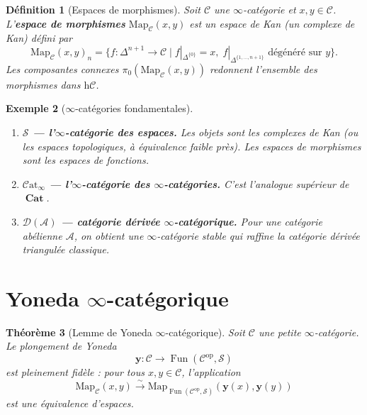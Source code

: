 \documentclass[a4paper,12pt]{book}
\DeclareMathOperator{\Fun}{Fun}
\DeclareMathOperator{\Cat}{\mathbf{Cat}}
\newcommand{\op}{\mathrm{op}}
\newtheorem{theoreme}{Théorème}[chapter]
\newtheorem{definition}[theoreme]{Définition}
\newtheorem{exemple}[theoreme]{Exemple}
\begin{document}
\begin{definition}[Espaces de morphismes]\label{def:mapping-space}
Soit $\mathcal{C}$ une $\infty$-catégorie et $x, y \in \mathcal{C}$.
L'\textbf{espace de morphismes} $\mathrm{Map}_\mathcal{C}(x, y)$
est un espace de Kan (un complexe de Kan) défini par
\[
  \mathrm{Map}_\mathcal{C}(x, y)_n
  = \{f \colon \Delta^{n+1} \to \mathcal{C} \mid
      f|_{\Delta^{\{0\}}} = x,\;
      f|_{\Delta^{\{1,\ldots,n+1\}}} \text{ dégénéré sur } y\}.
\]
Les composantes connexes $\pi_0(\mathrm{Map}_\mathcal{C}(x,y))$
redonnent l'ensemble des morphismes dans $\mathrm{h}\mathcal{C}$.
\end{definition}

\begin{exemple}[$\infty$-catégories fondamentales]\label{ex:infty-cats}
\begin{enumerate}[label=(\roman*)]
\item \textbf{$\mathcal{S}$ --- l'$\infty$-catégorie des espaces.}
      Les objets sont les complexes de Kan (ou les espaces
      topologiques, à équivalence faible près).  Les espaces de
      morphismes sont les espaces de fonctions.

\item \textbf{$\mathcal{C}\mathrm{at}_\infty$ --- l'$\infty$-catégorie
      des $\infty$-catégories.}
      C'est l'analogue supérieur de $\Cat$.

\item \textbf{$\mathcal{D}(\mathcal{A})$ --- catégorie dérivée
      $\infty$-catégorique.}
      Pour une catégorie abélienne $\mathcal{A}$, on obtient une
      $\infty$-catégorie stable qui raffine la catégorie dérivée
      triangulée classique.
\end{enumerate}
\end{exemple}

\section{Yoneda $\infty$-catégorique}\label{sec:yoneda-infty}

\begin{theoreme}[Lemme de Yoneda $\infty$-catégorique]
\label{thm:yoneda-infty}
Soit $\mathcal{C}$ une petite $\infty$-catégorie.  Le plongement
de Yoneda
\[
  \mathbf{y} \colon \mathcal{C} \longrightarrow
  \Fun(\mathcal{C}^\op, \mathcal{S})
\]
est pleinement fidèle : pour tous $x, y \in \mathcal{C}$, l'application
\[
  \mathrm{Map}_\mathcal{C}(x, y)
  \xrightarrow{\;\sim\;}
  \mathrm{Map}_{\Fun(\mathcal{C}^\op, \mathcal{S})}(\mathbf{y}(x), \mathbf{y}(y))
\]
est une équivalence d'espaces.
\end{theoreme}
\end{document}
